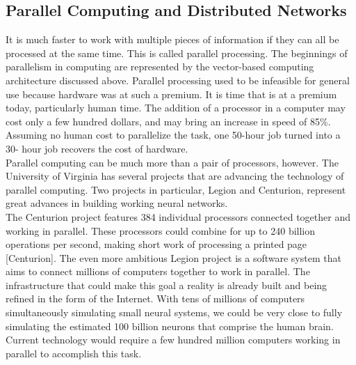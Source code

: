 \subsection{Parallel Computing and Distributed Networks}
It is much faster to work with multiple pieces of information if they can all be
processed at the same time. This is called parallel processing. The beginnings of
parallelism in computing are represented by the vector-based computing architecture
discussed above. Parallel processing used to be infeasible for general use because
hardware was at such a premium. It is time that is at a premium today, particularly
human time. The addition of a processor in a computer may cost only a few hundred
dollars, and may bring an increase in speed of 85\%. Assuming no human cost to parallelize the task, one 50-hour job turned into a 30- hour job recovers the cost of
hardware.\\
Parallel computing can be much more than a pair of processors, however. The
University of Virginia has several projects that are advancing the technology of parallel
computing. Two projects in particular, Legion and Centurion, represent great advances
in building working neural networks.\\
The Centurion project features 384 individual processors connected together and
working in parallel. These processors could combine for up to 240 billion operations per
second, making short work of processing a printed page [Centurion]. The even more
ambitious Legion project is a software system that aims to connect millions of computers
together to work in parallel. The infrastructure that could make this goal a reality is
already built and being refined in the form of the Internet. With tens of millions of
computers simultaneously simulating small neural systems, we could be very close to
fully simulating the estimated 100 billion neurons that comprise the human brain.
Current technology would require a few hundred million computers working in parallel to
accomplish this task.

